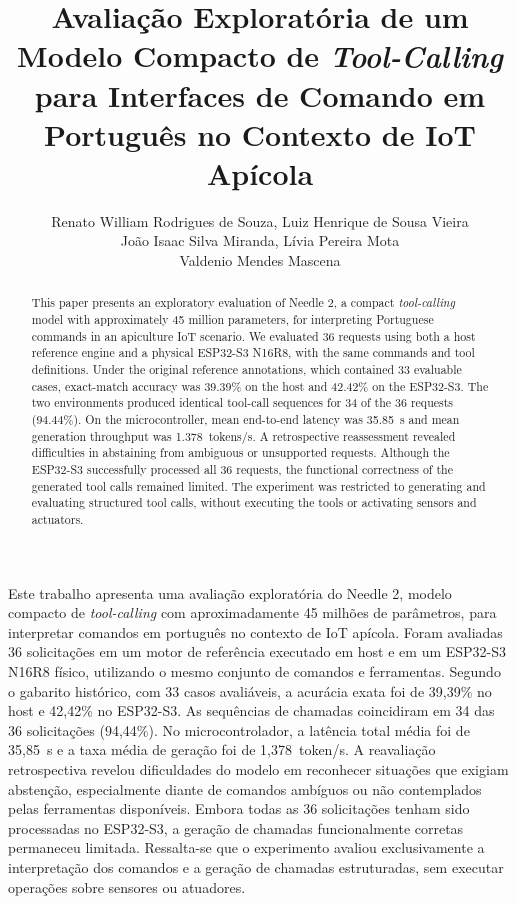 \documentclass[12pt]{article}
\title{Avaliação Exploratória de um Modelo Compacto de \emph{Tool-Calling}
para Interfaces de Comando em Português no Contexto de IoT Apícola}
\author{
Renato William Rodrigues de Souza,
Luiz Henrique de Sousa Vieira\\
João Isaac Silva Miranda,
Lívia Pereira Mota\\
Valdenio Mendes Mascena
}
\begin{document}
\maketitle


\begin{resumo}
Este trabalho apresenta uma avaliação exploratória do Needle 2,
modelo compacto de \textit{tool-calling} com aproximadamente
45 milhões de parâmetros, para interpretar comandos em português
no contexto de IoT apícola. Foram avaliadas 36 solicitações em
um motor de referência executado em host e em um ESP32-S3 N16R8
físico, utilizando o mesmo conjunto de comandos e ferramentas.
Segundo o gabarito histórico, com 33 casos avaliáveis, a
acurácia exata foi de 39,39\% no host e 42,42\% no ESP32-S3.
As sequências de chamadas coincidiram em 34 das 36 solicitações
(94,44\%). No microcontrolador, a latência total média foi
de 35,85~s e a taxa média de geração foi de
1,378~token/s. A reavaliação retrospectiva revelou dificuldades do modelo em reconhecer situações que exigiam abstenção, especialmente diante de comandos ambíguos ou não contemplados pelas ferramentas disponíveis. Embora todas as 36 solicitações tenham sido processadas no ESP32-S3, a geração de chamadas funcionalmente corretas permaneceu limitada. Ressalta-se que o experimento avaliou exclusivamente a interpretação dos comandos e a geração de chamadas estruturadas, sem executar operações sobre sensores ou atuadores.
\end{resumo}



\begin{abstract}
This paper presents an exploratory evaluation of Needle 2,
a compact \textit{tool-calling} model with approximately
45 million parameters, for interpreting Portuguese commands
in an apiculture IoT scenario. We evaluated 36 requests
using both a host reference engine and a physical
ESP32-S3 N16R8, with the same commands and tool definitions.
Under the original reference annotations, which contained
33 evaluable cases, exact-match accuracy was 39.39\%
on the host and 42.42\% on the ESP32-S3.
The two environments produced identical tool-call
sequences for 34 of the 36 requests (94.44\%).
On the microcontroller, mean end-to-end latency was
35.85~s and mean generation throughput was
1.378~tokens/s. A retrospective reassessment revealed difficulties in abstaining from ambiguous or unsupported requests. Although the ESP32-S3 successfully processed all 36 requests, the functional correctness of the generated tool calls remained limited. The experiment was restricted to generating and evaluating structured tool calls, without executing the tools or activating sensors and actuators.
\end{abstract}
\end{document}
